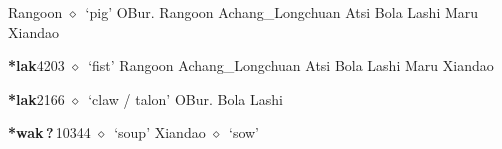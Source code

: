 \begin{list}{}{\leftmargin=1.5em \itemindent=-1.5em}
\hspace{1ex}
         Rangoon 
\hspace{1ex}
         $\diamond$~`pig'
         OBur. 
\hspace{1ex}
         Rangoon 
\hspace{1ex}
         Achang\_Longchuan 
\hspace{1ex}
         Atsi 
\hspace{1ex}
         Bola 
\hspace{1ex}
         Lashi 
\hspace{1ex}
         Maru 
\hspace{1ex}
         Xiandao 
  \item {\footnotesize \textbf{*lak}}{\tiny 4203}
\hspace{1ex}
         $\diamond$~`fist'
         Rangoon 
\hspace{1ex}
         Achang\_Longchuan 
\hspace{1ex}
         Atsi 
\hspace{1ex}
         Bola 
\hspace{1ex}
         Lashi 
\hspace{1ex}
         Maru 
\hspace{1ex}
         Xiandao 
  \item {\footnotesize \textbf{*lak}}{\tiny 2166}
\hspace{1ex}
         $\diamond$~`claw / talon'
         OBur. 
\hspace{1ex}
         Bola 
\hspace{1ex}
         Lashi 
  \item {\footnotesize \textbf{*wak\,?\,}}{\tiny 10344}
\hspace{1ex}
         $\diamond$~`soup'
         Xiandao 
\hspace{1ex}
         $\diamond$~`sow'

\end{list}
